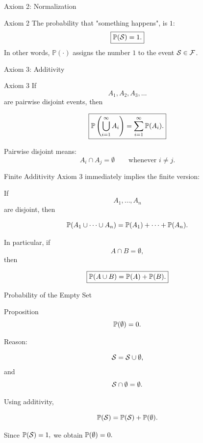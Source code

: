 \begin{frame}{Axiom 2: Normalization}
\begin{keybox}{Axiom 2}
The probability that "something happens", is $1$:
\[
\boxed{\mathbb{P}(\mathcal{S})=1.}
\]
In other words, $\mathbb{P}(\cdot)$ assigns the number $1$ to the event $\mathcal{S} \in \mathcal{F}$.
\end{keybox}

\end{frame}

\begin{frame}{Axiom 3: Additivity}
\begin{keybox}{Axiom 3}
If
\[
A_1,A_2,A_3,\dots
\]
are pairwise disjoint events, then

\[
\boxed{
\mathbb{P}\left(\bigcup_{i=1}^{\infty} A_i\right)
=
\sum_{i=1}^{\infty}\mathbb{P}(A_i).
}
\]
\end{keybox}

\vspace{0.25cm}

Pairwise disjoint means:
\[
A_i \cap A_j = \emptyset
\qquad \text{whenever } i\neq j.
\]
\end{frame}

\begin{frame}{Finite Additivity}
Axiom 3 immediately implies the finite version:

If
\[
A_1,\dots,A_n
\]
are disjoint, then

\[
\mathbb{P}(A_1\cup\cdots\cup A_n)
=
\mathbb{P}(A_1)+\cdots+\mathbb{P}(A_n).
\]

\vspace{0.3cm}

In particular, if
\[
A\cap B=\emptyset,
\]
then

\[
\boxed{
\mathbb{P}(A\cup B)=\mathbb{P}(A)+\mathbb{P}(B).
}
\]
\end{frame}


\begin{frame}{Probability of the Empty Set}
\begin{keybox}{Proposition}
\[
\mathbb{P}(\emptyset)=0.
\]
\end{keybox}

\vspace{0.25cm}

Reason:

\[
\mathcal{S} = \mathcal{S} \cup \emptyset,
\]
and
\[
\mathcal{S} \cap \emptyset=\emptyset.
\]

Using additivity,

\[
\mathbb{P}(\mathcal{S})
=
\mathbb{P}(\mathcal{S})+\mathbb{P}(\emptyset).
\]

Since $\mathbb{P}(\mathcal{S})=1,$ we obtain ${\mathbb{P}(\emptyset)=0.}
$
\end{frame}

